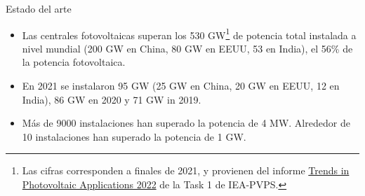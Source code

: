 \documentclass[aspectratio=169, usenames,svgnames,dvipsnames]{beamer}
\begin{document}
\begin{frame}[label={sec:orgf66a99b}]{Estado del arte}
\begin{itemize}
\item Las centrales fotovoltaicas superan los 530 GW\footnote{Las cifras corresponden a finales de 2021, y provienen del informe \guillemotleft{}\href{https://iea-pvps.org/trends\_reports/trends-2022/}{Trends in Photovoltaic Applications 2022}\guillemotright{} de la Task 1 de IEA-PVPS.}  de potencia total instalada a nivel mundial (200 GW en China, 80 GW en EEUU, 53 en India), el 56\% de la potencia fotovoltaica.
\item En 2021 se instalaron 95 GW (25 GW en China, 20 GW en EEUU, 12 en India), 86 GW en 2020 y 71 GW in 2019.
\item Más de 9000 instalaciones han superado la potencia de 4 MW. Alrededor de 10 instalaciones han superado la potencia de 1 GW.
\end{itemize}
\end{frame}
\end{document}
